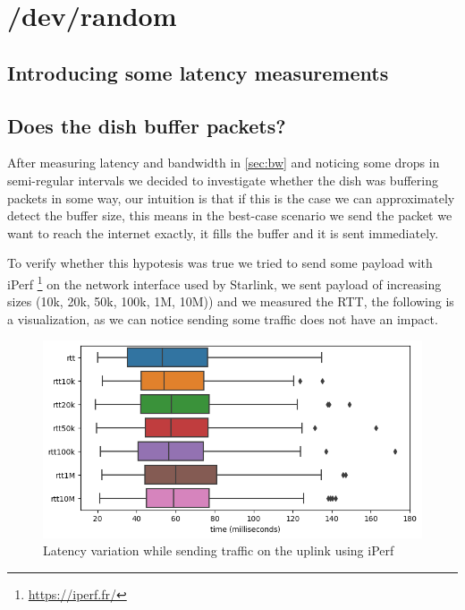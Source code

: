 \documentclass[IN,11pt,twoside,openright,bachelor,english]{tumthesis}
\begin{document}
\chapter{/dev/random}

\section{Introducing some latency measurements}
\section{Does the dish buffer packets?}


After measuring latency and bandwidth in \ref{sec:bw} and noticing some drops in semi-regular intervals we decided to investigate whether the dish was buffering packets in some way, our intuition is that if this is the case we can approximately detect the buffer size, this means in the best-case scenario we send the packet we want to reach the internet exactly, it fills the buffer and it is sent immediately.

To verify whether this hypotesis was true we tried to send some payload with iPerf \footnote{\url{https://iperf.fr/}} on the network interface used by Starlink, we sent payload of increasing sizes (10k, 20k, 50k, 100k, 1M, 10M)) and we measured the RTT, the following is a visualization, as we can notice sending some traffic does not have an impact.


\begin{figure}
	\centering
	\includegraphics[width=0.6\columnwidth]{img/latency_iperf.png}
	\caption{Latency variation while sending traffic on the uplink using iPerf}
\end{figure}



\end{document}
